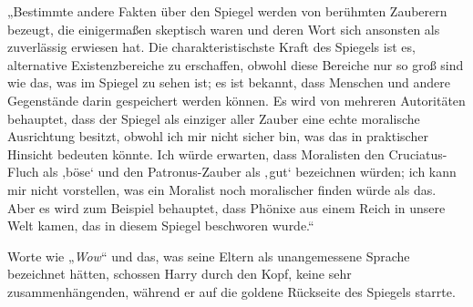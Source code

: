 „Bestimmte andere Fakten über den Spiegel werden von berühmten Zauberern bezeugt, die einigermaßen skeptisch waren und deren Wort sich ansonsten als zuverlässig erwiesen hat. Die charakteristischste Kraft des Spiegels ist es, alternative Existenzbereiche zu erschaffen, obwohl diese Bereiche nur so groß sind wie das, was im Spiegel zu sehen ist; es ist bekannt, dass Menschen und andere Gegenstände darin gespeichert werden können. Es wird von mehreren Autoritäten behauptet, dass der Spiegel als einziger aller Zauber eine echte moralische Ausrichtung besitzt, obwohl ich mir nicht sicher bin, was das in praktischer Hinsicht bedeuten könnte. Ich würde erwarten, dass Moralisten den Cruciatus-Fluch als ‚böse‘ und den Patronus-Zauber als ‚gut‘ bezeichnen würden; ich kann mir nicht vorstellen, was ein Moralist noch moralischer finden würde als das. Aber es wird zum Beispiel behauptet, dass Phönixe aus einem Reich in unsere Welt kamen, das in diesem Spiegel beschworen wurde.“

Worte wie „\emph{Wow}“ und das, was seine Eltern als unangemessene Sprache bezeichnet hätten, schossen Harry durch den Kopf, keine sehr zusammenhängenden, während er auf die goldene Rückseite des Spiegels starrte.


